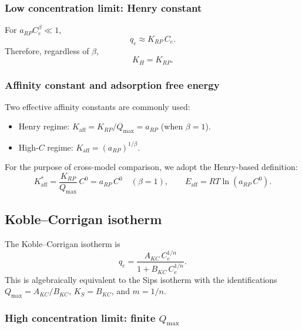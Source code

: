 \documentclass[journal=aamick,manuscript=article]{achemso}
\begin{document}
\subsubsection{Low concentration limit: Henry constant}

For $a_{RP}C_e^{\beta} \ll 1$,
\begin{equation}
	q_e \approx K_{RP}\, C_e.
\end{equation}
Therefore, regardless of $\beta$,
\begin{equation}
	\boxed{K_H = K_{RP}.}
\end{equation}

\subsubsection{Affinity constant and adsorption free energy}

Two effective affinity constants are commonly used:
\begin{itemize}
	\item Henry regime: $K_{\mathrm{aff}} = K_{RP}/Q_{\max} = a_{RP}$ (when $\beta=1$).
	\item High-$C$ regime: $K_{\mathrm{aff}} = (a_{RP})^{1/\beta}$.
\end{itemize}
For the purpose of cross-model comparison, we adopt the Henry-based definition:
\begin{equation}
	\boxed{
		K_{\mathrm{aff}}^{\ast} = \frac{K_{RP}}{Q_{\max}}\, C^0
		= a_{RP}\, C^0 \quad (\beta=1),
		\qquad
		E_{\mathrm{aff}} = RT\ln(a_{RP}\, C^0).
	}
\end{equation}

\subsection{Koble--Corrigan isotherm}
\label{sec:si_koble_corrigan}

The Koble--Corrigan isotherm is
\begin{equation}
	q_e = \frac{A_{KC}\, C_e^{1/n}}{1 + B_{KC}\, C_e^{1/n}}.
	\label{eq:si_koble_corrigan}
\end{equation}
This is algebraically equivalent to the Sips isotherm with the identifications
$Q_{\max} = A_{KC}/B_{KC}$, $K_S = B_{KC}$, and $m = 1/n$.

\subsubsection{High concentration limit: finite $Q_{\max}$}
\end{document}
